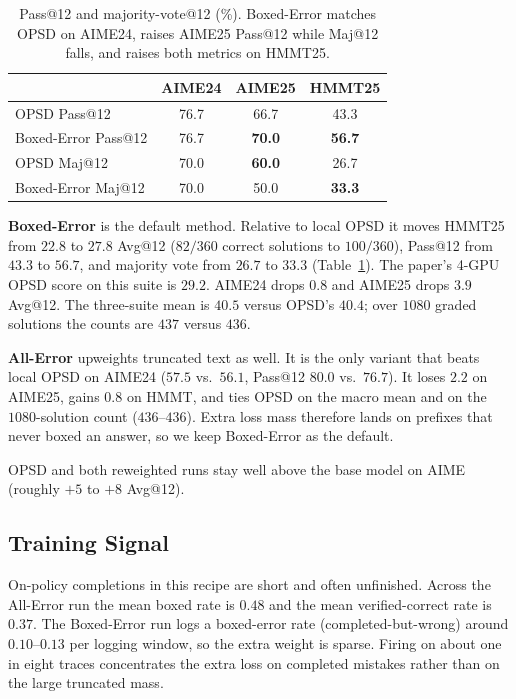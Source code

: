 \documentclass[letterpaper]{article}
\begin{document}
\begin{table}[t]
\centering
\setlength{\tabcolsep}{3.2pt}
\begin{tabular}{lccc}
\hline
 & AIME24 & AIME25 & HMMT25 \\
\hline
OPSD Pass@12 & 76.7 & 66.7 & 43.3 \\
Boxed-Error Pass@12 & 76.7 & \textbf{70.0} & \textbf{56.7} \\
OPSD Maj@12 & 70.0 & \textbf{60.0} & 26.7 \\
Boxed-Error Maj@12 & 70.0 & 50.0 & \textbf{33.3} \\
\hline
\end{tabular}
\caption{Pass@12 and majority-vote@12 (\%). Boxed-Error matches OPSD on AIME24, raises AIME25 Pass@12 while Maj@12 falls, and raises both metrics on HMMT25.}
\label{tab:aux}
\end{table}

\textbf{Boxed-Error} is the default method. Relative to local OPSD it moves HMMT25 from $22.8$ to $27.8$ Avg@12 ($82/360$ correct solutions to $100/360$), Pass@12 from $43.3$ to $56.7$, and majority vote from $26.7$ to $33.3$ (Table~\ref{tab:aux}). The paper's 4-GPU OPSD score on this suite is $29.2$. AIME24 drops $0.8$ and AIME25 drops $3.9$ Avg@12. The three-suite mean is $40.5$ versus OPSD's $40.4$; over $1080$ graded solutions the counts are $437$ versus $436$.

\textbf{All-Error} upweights truncated text as well. It is the only variant that beats local OPSD on AIME24 ($57.5$ vs.\ $56.1$, Pass@12 $80.0$ vs.\ $76.7$). It loses $2.2$ on AIME25, gains $0.8$ on HMMT, and ties OPSD on the macro mean and on the $1080$-solution count ($436$--$436$). Extra loss mass therefore lands on prefixes that never boxed an answer, so we keep Boxed-Error as the default.

OPSD and both reweighted runs stay well above the base model on AIME (roughly $+5$ to $+8$ Avg@12).

\subsection{Training Signal}

On-policy completions in this recipe are short and often unfinished. Across the All-Error run the mean boxed rate is $0.48$ and the mean verified-correct rate is $0.37$. The Boxed-Error run logs a boxed-error rate (completed-but-wrong) around $0.10$--$0.13$ per logging window, so the extra weight is sparse. Firing on about one in eight traces concentrates the extra loss on completed mistakes rather than on the large truncated mass.
\end{document}
